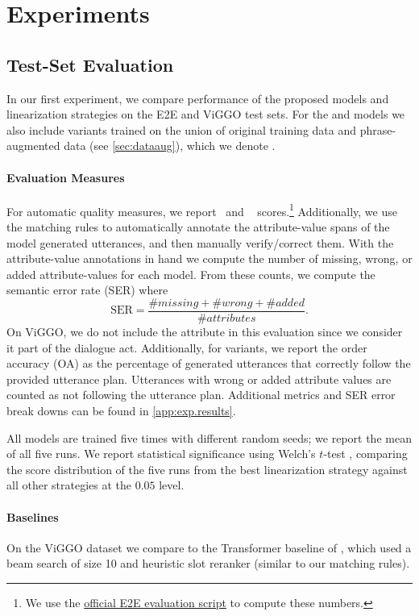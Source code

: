 \section{Experiments}

\subsection{Test-Set Evaluation}

In our first experiment, we compare performance of the proposed models and
linearization strategies on the E2E and ViGGO test sets. For the 
and  models we also include variants trained on
the union of original training data and phrase-augmented data (see
\autoref{sec:dataaug}), which we denote \phraseAug.

\paragraph{Evaluation Measures} For automatic quality measures, we report
\bleu~and \rougel~\cite{lin2004} scores.\footnote{We use the
\href{https://github.com/tuetschek/e2e-metrics}{official E2E evaluation
script} to compute these numbers.} Additionally, we use the matching rules to
automatically annotate the attribute-value spans of the model generated
utterances, and then manually verify/correct them. With the attribute-value
annotations in hand we compute the number of missing, wrong, or added
attribute-values for each model. From these counts, we compute the semantic
error rate (SER) \cite{dusek2020} where \[ \textrm{SER} = \frac{\#missing +
\#wrong + \#added}{\#attributes}.\]  On ViGGO, we do not include the
 attribute in this evaluation since we consider it part of the
dialogue act.  Additionally, for  variants, we report the order
accuracy (OA) as the percentage of generated utterances that correctly follow
the provided utterance plan. Utterances with wrong or added attribute values
are counted as not following the utterance plan. Additional metrics
and SER error break downs can be found in \autoref{app:exp.results}.

{\color{red}All models are trained five times with different random seeds; we report
the mean of all five runs. We report statistical significance
using Welch's $t$-test \cite{welch1947}, comparing the score distribution of the five runs from the best linearization strategy against all other strategies
at the $0.05$ level.}

\paragraph{Baselines} On the ViGGO dataset we compare to the Transformer
baseline of \citet{juraska2019}, which used a beam search of size 10 and
heuristic slot reranker (similar to our matching rules).



